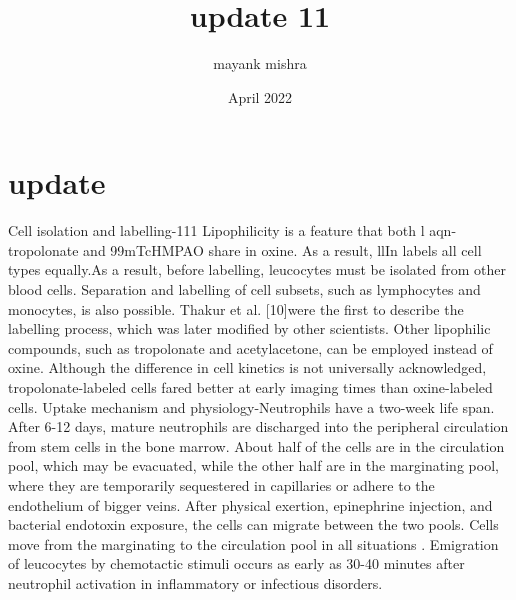\documentclass{article}
\title{update 11}
\author{mayank mishra }
\date{April 2022}
\begin{document}
\maketitle

\section{update}
Cell isolation and labelling-111 Lipophilicity is a feature that both l aqn-tropolonate and 99mTcHMPAO share in oxine. As a result, llIn labels all cell types equally.As a result, before labelling,
leucocytes must be isolated from other blood cells. Separation and labelling of cell subsets, such
as lymphocytes and monocytes, is also possible. Thakur et al. [10]were the first to describe the
labelling process, which was later modified by other scientists. Other lipophilic compounds, such
as tropolonate and acetylacetone, can be employed instead of oxine. Although the difference in cell
kinetics is not universally acknowledged, tropolonate-labeled cells fared better at early imaging times
than oxine-labeled cells.
Uptake mechanism and physiology-Neutrophils have a two-week life span. After 6-12 days,
mature neutrophils are discharged into the peripheral circulation from stem cells in the bone marrow.
About half of the cells are in the circulation pool, which may be evacuated, while the other half are
in the marginating pool, where they are temporarily sequestered in capillaries or adhere to the
endothelium of bigger veins. After physical exertion, epinephrine injection, and bacterial endotoxin
exposure, the cells can migrate between the two pools. Cells move from the marginating to the
circulation pool in all situations . Emigration of leucocytes by chemotactic stimuli occurs as early
as 30-40 minutes after neutrophil activation in inflammatory or infectious disorders.
\end{document}

